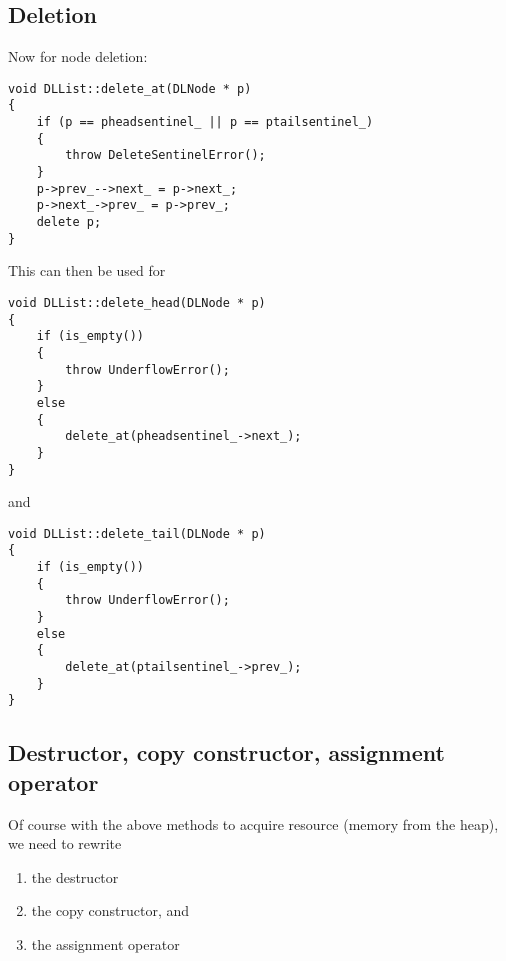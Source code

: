 \newpage
\subsection{Deletion}
Now for node deletion:
\begin{Verbatim}[frame=single,fontsize=\footnotesize]
void DLList::delete_at(DLNode * p)
{
    if (p == pheadsentinel_ || p == ptailsentinel_)
    {
        throw DeleteSentinelError();
    }
    p->prev_-->next_ = p->next_;
    p->next_->prev_ = p->prev_;
    delete p;
}
\end{Verbatim}
This can then be used for
\begin{Verbatim}[frame=single,fontsize=\footnotesize]
void DLList::delete_head(DLNode * p)
{
    if (is_empty())
    {
        throw UnderflowError();
    }
    else
    {
        delete_at(pheadsentinel_->next_);
    }
}
\end{Verbatim}
and
\begin{Verbatim}[frame=single,fontsize=\footnotesize]
void DLList::delete_tail(DLNode * p)
{
    if (is_empty())
    {
        throw UnderflowError();
    }
    else
    {
        delete_at(ptailsentinel_->prev_);
    }
}
\end{Verbatim}


\newpage
\subsection{Destructor, copy constructor, assignment operator}
Of course with the above methods to acquire resource (memory from the heap),
we need to rewrite
\begin{enumerate}[nosep]
\item the destructor
\item the copy constructor, and
\item the assignment operator
\end{enumerate}

